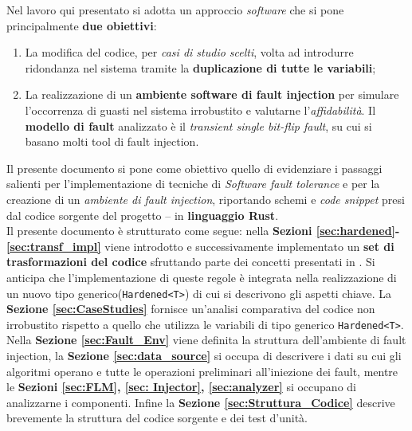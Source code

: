 \noindent
Nel lavoro qui presentato si adotta un approccio \textit{software} che si pone principalmente \textbf{due obiettivi}: 
\begin{enumerate}
    \itemsep-0.3em
    \item La modifica del codice, per \textit{casi di studio scelti}, volta ad introdurre ridondanza nel sistema tramite la \textbf{duplicazione di tutte le variabili}; 
    \item La realizzazione di un \textbf{ambiente software di fault injection} per simulare l'occorrenza di guasti nel sistema irrobustito e valutarne l'\textit{affidabilità}. Il \textbf{modello di fault} analizzato è il \textit{transient single bit-flip fault}, su cui si basano molti tool di fault injection. 
\end{enumerate}

\noindent 
Il presente documento si pone come obiettivo quello di evidenziare i passaggi salienti per l'implementazione di tecniche di \textit{Software fault tolerance} e per la creazione di un \textit{ambiente di fault injection}, riportando schemi e \textit{code snippet}  presi dal codice sorgente del progetto -- in \textbf{linguaggio Rust}.\\
Il presente documento è strutturato come segue: nella \textbf{Sezioni \ref{sec:hardened}-\ref{sec:transf_impl}} viene introdotto e successivamente implementato un \textbf{set di trasformazioni del codice} sfruttando parte dei concetti presentati in \cite{rebaudengo1999soft}. Si anticipa che l'implementazione di queste regole è integrata nella realizzazione di un nuovo tipo generico(\texttt{Hardened<T>}) di cui si descrivono gli aspetti chiave. La \textbf{Sezione \ref{sec:CaseStudies}} fornisce un'analisi comparativa del codice non irrobustito rispetto a quello che utilizza le variabili di tipo generico \texttt{Hardened<T>}. Nella \textbf{Sezione \ref{sec:Fault_Env}} viene definita la struttura dell'ambiente di fault injection, la \textbf{
    Sezione \ref{sec:data_source} 
} si occupa di descrivere i dati su cui gli algoritmi operano e tutte le operazioni preliminari all'iniezione dei fault, mentre le \textbf{Sezioni \ref{sec:FLM}, \ref{sec: Injector}, \ref{sec:analyzer}} si occupano di analizzarne i componenti. Infine la \textbf{Sezione \ref{sec:Struttura_Codice}} descrive brevemente la struttura del codice sorgente e dei test d'unità.
